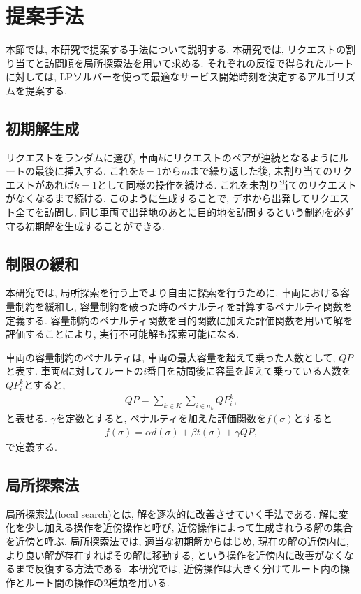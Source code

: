 \chapter{提案手法}\label{method}
本節では, 本研究で提案する手法について説明する. 本研究では, リクエストの割り当てと訪問順を局所探索法を用いて求める. それぞれの反復で得られたルートに対しては, LPソルバーを使って最適なサービス開始時刻を決定するアルゴリズムを提案する.
\section{初期解生成}
リクエストをランダムに選び, 車両$k$にリクエストのペアが連続となるようにルートの最後に挿入する. これを$k = 1 から m$まで繰り返した後, 未割り当てのリクエストがあれば$k = 1 $として同様の操作を続ける. これを未割り当てのリクエストがなくなるまで続ける.
このように生成することで, デポから出発してリクエスト全てを訪問し, 同じ車両で出発地のあとに目的地を訪問するという制約を必ず守る初期解を生成することができる.

\section{制限の緩和}
本研究では, 局所探索を行う上でより自由に探索を行うために, 車両における容量制約を緩和し, 容量制約を破った時のペナルティを計算するペナルティ関数を定義する. 容量制約のペナルティ関数を目的関数に加えた評価関数を用いて解を評価することにより, 実行不可能解も探索可能になる.

車両の容量制約のペナルティは, 車両の最大容量を超えて乗った人数として, $QP$と表す. 車両$k$に対してルートの$i$番目を訪問後に容量を超えて乗っている人数を$QP_i^k$とすると,
\begin{align*}
  QP = \sum_{k \in K}\sum_{i \in n_k} QP_i^k,
\end{align*}
と表せる. 
$\gamma$を定数とすると, ペナルティを加えた評価関数を$f(\sigma)$とすると
\begin{align*}
  f(\sigma) = \alpha d(\sigma)+ \beta t(\sigma) + \gamma QP,
\end{align*}
で定義する.

\section{局所探索法}
局所探索法(local search)とは, 解を逐次的に改善させていく手法である. 解に変化を少し加える操作を近傍操作と呼び, 近傍操作によって生成されうる解の集合を近傍と呼ぶ. 局所探索法では, 適当な初期解からはじめ, 現在の解の近傍内に, より良い解が存在すればその解に移動する, という操作を近傍内に改善がなくなるまで反復する方法である. 本研究では, 近傍操作は大きく分けてルート内の操作とルート間の操作の2種類を用いる.

